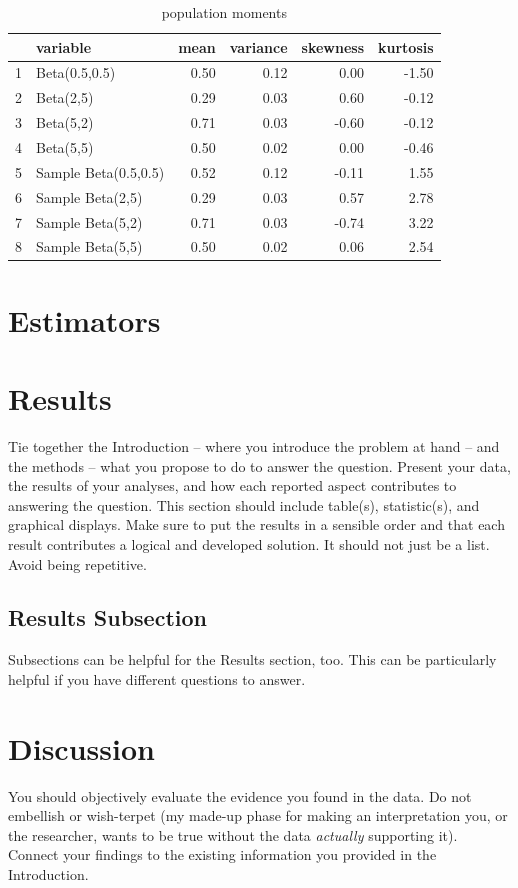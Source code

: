 \documentclass{article}\usepackage[]{graphicx}\usepackage[]{xcolor}
\begin{document}
\begin{multicols}{2}
\begin{table}[H]
\centering
\begin{tabular}{rlrrrr}
  \hline
 & variable & mean & variance & skewness & kurtosis \\ 
  \hline
1 & Beta(0.5,0.5) & 0.50 & 0.12 & 0.00 & -1.50 \\ 
  2 & Beta(2,5) & 0.29 & 0.03 & 0.60 & -0.12 \\ 
  3 & Beta(5,2) & 0.71 & 0.03 & -0.60 & -0.12 \\ 
  4 & Beta(5,5) & 0.50 & 0.02 & 0.00 & -0.46 \\ 
  5 & Sample Beta(0.5,0.5) & 0.52 & 0.12 & -0.11 & 1.55 \\ 
  6 & Sample Beta(2,5) & 0.29 & 0.03 & 0.57 & 2.78 \\ 
  7 & Sample Beta(5,2) & 0.71 & 0.03 & -0.74 & 3.22 \\ 
  8 & Sample Beta(5,5) & 0.50 & 0.02 & 0.06 & 2.54 \\ 
   \hline
\end{tabular} \caption{population moments } \label{table1}
\end{table}



\section{Estimators}

\section{Results}
Tie together the Introduction -- where you introduce the problem at hand -- and the methods --  what you propose to do to answer the question. Present your data, the results of your analyses, and how each reported aspect contributes to answering the question. This section should include table(s), statistic(s), and graphical displays. Make sure to put the results in a sensible order and that each result contributes a logical and developed solution. It should not just be a list. Avoid being repetitive. 

\subsection{Results Subsection}
Subsections can be helpful for the Results section, too. This can be particularly helpful if you have different questions to answer. 


\section{Discussion}
 You should objectively evaluate the evidence you found in the data. Do not embellish or wish-terpet (my made-up phase for making an interpretation you, or the researcher, wants to be true without the data \emph{actually} supporting it). Connect your findings to the existing information you provided in the Introduction.


\end{multicols}
\end{document}
